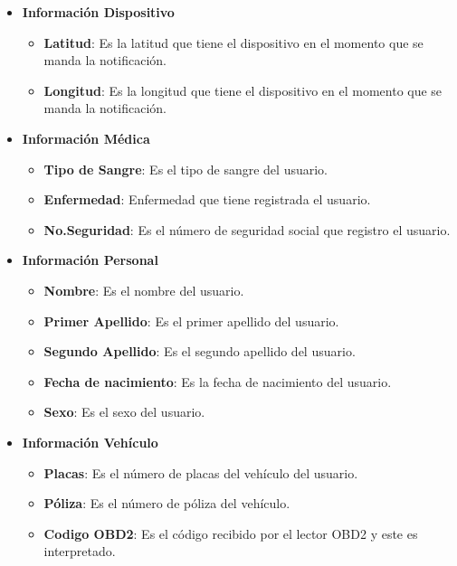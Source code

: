 \begin{itemize}
	\item \textbf{Información Dispositivo}
	\begin{itemize}
		\item \textbf{Latitud}: Es la latitud que tiene el dispositivo en el momento que se manda la notificación.
		\item \textbf{Longitud}: Es la longitud que tiene el dispositivo en el momento que se manda la notificación.
	\end{itemize}
	
	\item \textbf{Información Médica}
	
	\begin{itemize}
		\item \textbf{Tipo de Sangre}: Es el tipo de sangre del usuario.
		\item \textbf{Enfermedad}: Enfermedad que tiene registrada el usuario.
		\item \textbf{No.Seguridad}: Es el número de seguridad social que registro el usuario.
	\end{itemize}
	
	\item \textbf{Información Personal}
	
	\begin{itemize}
		\item \textbf{Nombre}: Es el nombre del usuario.
		\item \textbf{Primer Apellido}: Es el primer apellido del usuario.
		\item \textbf{Segundo Apellido}: Es el segundo apellido del usuario.
		\item \textbf{Fecha de nacimiento}: Es la fecha de nacimiento del usuario.
		\item \textbf{Sexo}: Es el sexo del usuario.
	\end{itemize}
	
	\item \textbf{Información Vehículo}
	
	\begin{itemize}
		\item \textbf{Placas}: Es el número de placas del vehículo del usuario.
		\item \textbf{Póliza}: Es el número de póliza del vehículo.
		\item \textbf{Codigo OBD2}: Es el código recibido por el lector OBD2 y este es interpretado.
	\end{itemize}
	
\end{itemize}
